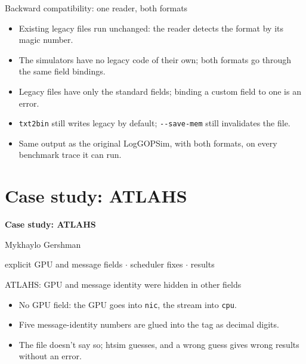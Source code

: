 \documentclass[aspectratio=169,11pt]{beamer}
\newcommand{\diagram}[1]{\resizebox{\linewidth}{!}{}}
\begin{document}
\begin{frame}{Backward compatibility: one reader, both formats}
\vspace{2mm}\centering\resizebox{!}{0.42\textheight}{}
\par\raggedright\small
\begin{itemize}
\item Existing legacy files run unchanged: the reader detects the format by its magic number.
\item The simulators have no legacy code of their own; both formats go through the same field bindings.
\item Legacy files have only the standard fields; binding a custom field to one is an error.
\item \texttt{txt2bin} still writes legacy by default; \texttt{-{}-save-mem} still invalidates the file.
\item Same output as the original LogGOPSim, with both formats, on every benchmark trace it can run.
\end{itemize}
\end{frame}


\section{Case study: ATLAHS}

\begin{frame}
\centering\vfill
{\Huge\bfseries Case study: ATLAHS\par}
\vspace{4mm}
{\large Mykhaylo Gershman\par}
\vspace{3mm}
{\small\color{black!60}explicit GPU and message fields $\cdot$ scheduler fixes $\cdot$ results\par}
\vfill
\end{frame}

\begin{frame}{ATLAHS: GPU and message identity were hidden in other fields}
\vspace{6mm}
\diagram{legacy-gpu-record}
\vspace{5mm}
\begin{itemize}
\item No GPU field: the GPU goes into \texttt{nic}, the stream into \texttt{cpu}.
\item Five message-identity numbers are glued into the tag as decimal digits.
\item The file doesn't say so; htsim guesses, and a wrong guess gives wrong results without an error.
\end{itemize}
\end{frame}
\end{document}
